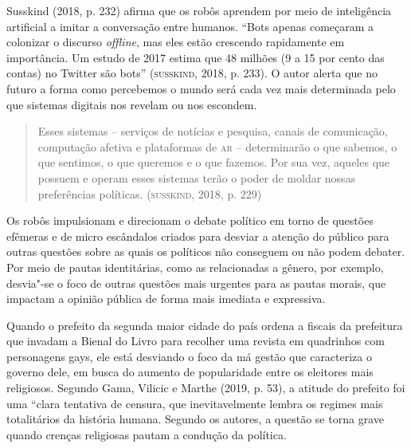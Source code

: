 Susskind (2018, p. 232) afirma que os robôs aprendem por meio de
inteligência artificial a imitar a conversação entre humanos. ``Bots
apenas começaram a colonizar o discurso \emph{offline}, mas eles estão
crescendo rapidamente em importância. Um estudo de 2017 estima que 48
milhões (9 a 15 por cento das contas) no Twitter são bots'' (\textsc{susskind},
2018, p. 233). O autor alerta que no futuro a forma como percebemos o
mundo será cada vez mais determinada pelo que sistemas digitais nos
revelam ou nos escondem.

\begin{quote}
Esses sistemas -- serviços de notícias e pesquisa, canais de
comunicação, computação afetiva e plataformas de \textsc{ar} -- determinarão o
que sabemos, o que sentimos, o que queremos e o que fazemos. Por sua
vez, aqueles que possuem e operam esses sistemas terão o poder de moldar
nossas preferências políticas. (\textsc{susskind}, 2018, p. 229)
\end{quote}

Os robôs impulsionam e direcionam o debate político em torno de questões
efêmeras e de micro escândalos criados para desviar a atenção do público
para outras questões sobre as quais os políticos não conseguem ou não
podem debater. Por meio de pautas identitárias, como as relacionadas a
gênero, por exemplo, desvia"-se o foco de outras questões mais urgentes
para as pautas morais, que impactam a opinião pública de forma mais
imediata e expressiva.

Quando o prefeito da segunda maior cidade do país ordena a fiscais da
prefeitura que invadam a Bienal do Livro para recolher uma revista em
quadrinhos com personagens gays, ele está desviando o foco da má gestão
que caracteriza o governo dele, em busca do aumento de popularidade
entre os eleitores mais religiosos. Segundo Gama, Vilicic e Marthe
(2019, p. 53), a atitude do prefeito foi uma ``clara tentativa de
censura, que inevitavelmente lembra os regimes mais totalitários da
história humana. Segundo os autores, a questão se torna grave quando
crenças religiosas pautam a condução da política.

